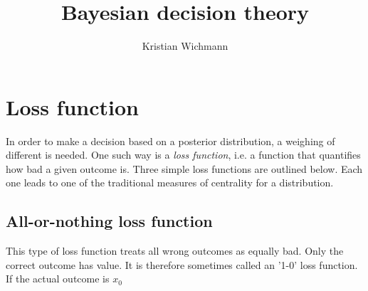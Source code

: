 \documentclass[12pt, a4paper]{article}
\title{Bayesian decision theory}
\author{Kristian Wichmann}
\numberwithin{equation}{section}
\begin{document}
\maketitle

\section{Loss function}
In order to make a decision based on a posterior distribution, a weighing of different is needed. One such way is a \textit{loss function}, i.e. a function that quantifies how bad a given outcome is. Three simple loss functions are outlined below. Each one leads to one of the traditional measures of centrality for a distribution.

\subsection{All-or-nothing loss function}
This type of loss function treats all wrong outcomes as equally bad. Only the correct outcome has value. It is therefore sometimes called an '1-0' loss function. If the actual outcome is $x_0$
\end{document}
